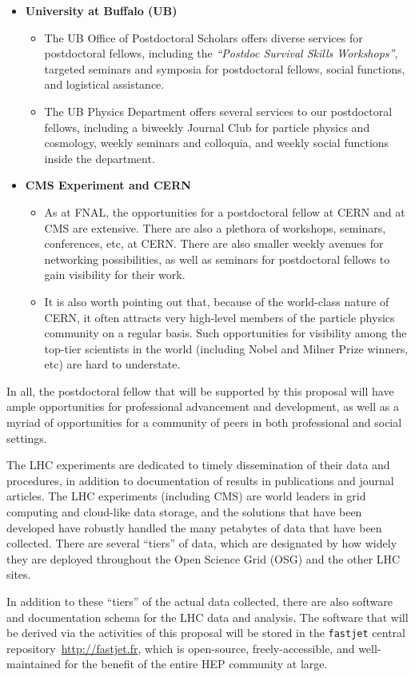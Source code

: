\documentclass[12pt]{article}
\begin{document}
\begin{itemize}
\item {\bf University at Buffalo (UB)}
\begin{itemize}
\item The UB Office of Postdoctoral Scholars offers diverse services
  for postdoctoral fellows, including the {\sl ``Postdoc Survival
    Skills Workshops''}, targeted seminars and symposia for
  postdoctoral fellows, social functions, and logistical assistance. 
\item The UB Physics Department offers several services to our
  postdoctoral fellows, including a biweekly Journal Club for particle
  physics and cosmology, weekly seminars and colloquia, and weekly
  social functions inside the department. 
\end{itemize}
\item {\bf CMS Experiment and CERN}
\begin{itemize}
\item As at FNAL, the opportunities for a postdoctoral fellow at CERN
  and at CMS are extensive. There are also a plethora of workshops,
  seminars, conferences, etc, at CERN. There are also smaller weekly
  avenues for networking possibilities, as well as seminars for
  postdoctoral fellows to gain visibility for their work. 
\item It is also worth pointing out that, because of the world-class
  nature of CERN, it often attracts very high-level members of the
  particle physics community on a regular basis. Such opportunities
  for visibility among the top-tier scientists in the world (including
  Nobel and Milner Prize winners, etc) are hard to understate. 
\end{itemize}
\end{itemize}

In all, the postdoctoral fellow that will be supported by this
proposal will have ample opportunities for professional advancement
and development, as well as a myriad of opportunities for a community
of peers in both professional and social settings. 



\newpage
{}
\renewcommand{\thepage} {E--\arabic{page}}

The LHC experiments are dedicated to timely dissemination of their data and
procedures, in addition to documentation of results in publications
and journal articles. The LHC experiments (including CMS) are world
leaders in grid computing and cloud-like data storage, and the
solutions that have been developed have robustly handled the many
petabytes of data that have been collected. There are several
``tiers'' of data, which are designated by how widely they are
deployed throughout the Open Science Grid (OSG) and the other LHC
sites. 

In addition to these ``tiers'' of the actual data collected, there are
also software and documentation schema for the LHC data and analysis. 
The software that will be derived via the activities of this proposal
will be stored in the {\tt fastjet} central
repository~\url{http://fastjet.fr}, which is
open-source, freely-accessible, and well-maintained for the benefit of
the entire HEP community at large. 
\end{document}
